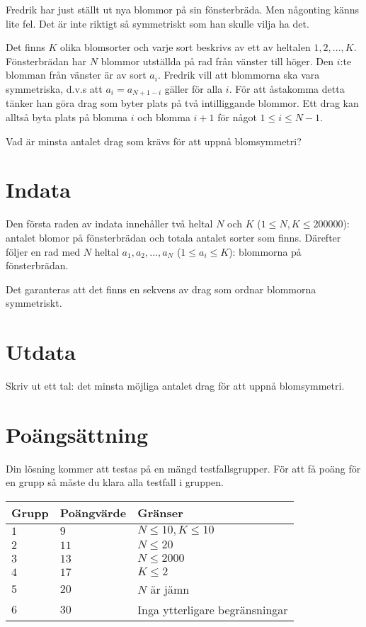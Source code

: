 
Fredrik har just ställt ut nya blommor på sin fönsterbräda. Men någonting känns lite fel. 
Det är inte riktigt så symmetriskt som han skulle vilja ha det.

Det finns $K$ olika blomsorter och varje sort beskrivs av ett av heltalen $1,2,...,K$. Fönsterbrädan har $N$ blommor utställda på rad från vänster till höger.
Den $i$:te blomman från vänster är av sort $a_i$.
Fredrik vill att blommorna ska vara symmetriska, d.v.s att $a_i=a_{N+1-i}$ gäller för alla $i$. 
För att åstakomma detta tänker han göra drag som byter plats på två intilliggande blommor.
Ett drag kan alltså byta plats på blomma $i$ och blomma $i+1$ för något $1\le i \le N-1$.

Vad är minsta antalet drag som krävs för att uppnå blomsymmetri?
\section*{Indata}

Den första raden av indata innehåller två heltal $N$ och $K$ ($1 \le N,K \le 200 000$): 
antalet blomor på fönsterbrädan och totala antalet sorter som finns.
Därefter följer en rad med $N$ heltal $a_1,a_2,...,a_N$ ($1\le a_i \le K$): blommorna på fönsterbrädan.

Det garanteras att det finns en sekvens av drag som ordnar blommorna symmetriskt.

\section*{Utdata}

Skriv ut ett tal: det minsta möjliga antalet drag för att uppnå blomsymmetri.

\section*{Poängsättning}
Din lösning kommer att testas på en mängd testfallsgrupper.
För att få poäng för en grupp så måste du klara alla testfall i gruppen.

\noindent
\begin{tabular}{| l | l | l |}
  \hline
  Grupp & Poängvärde & Gränser \\ \hline
  $1$    & $9$         &  $N\le 10, K \le 10$ \\ \hline
  $2$    & $11$        &  $N \le 20$ \\ \hline
  $3$    & $13$        &  $N \le 2000$ \\ \hline
  $4$    & $17$        &  $K \le 2$ \\ \hline
  $5$    & $20$        &  $N$ är jämn \\ \hline 
  $6$    & $30$        &  Inga ytterligare begränsningar \\ \hline
\end{tabular}

